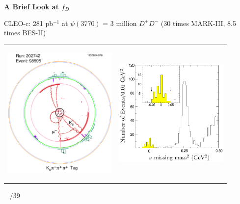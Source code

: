 \documentclass[landscape]{article}
\newenvironment{slide}[1][ ]{}{\mbox{ } \hfill \arabic{page}/39 \pagebreak}
\begin{document}
\begin{slide}
{\Huge \bf A Brief Look at $f_D$}

\vspace{0.75 cm}
CLEO-c: 281 pb$^{-1}$ at $\psi(3770)$ = 3 million $D^+D^-$ (30 times MARK-III, 8.5 times BES-II) %

\vfill
\begin{center}
\begin{tabular}{p{0.45\linewidth} p{0.45\linewidth}}
\begin{minipage}{\linewidth}
\begin{center}
\includegraphics[width=0.8\linewidth]{dmunu_event}
\end{center}
\end{minipage} &
\begin{minipage}{\linewidth}
\includegraphics[width=\linewidth]{dmunu_mm}
\end{minipage}
\end{tabular}
\end{center}


\end{slide}
\end{document}
